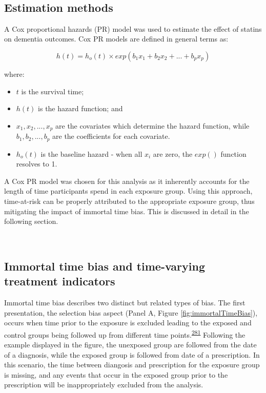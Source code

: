 \documentclass[a4paper, twoside]{templates/ociamthesis}
\providecommand{\tightlist}{%
  \setlength{\itemsep}{0pt}\setlength{\parskip}{0pt}}
\begin{document}
~

\hypertarget{estimation-methods}{%
\subsection{Estimation methods}\label{estimation-methods}}

A Cox proportional hazards (PR) model was used to estimate the effect of statins on dementia outcomes. Cox PR models are defined in general terms as:

\begin{equation}
  h(t) = h_o(t) \times exp(b_1x_1 + b_2x_2 + ... +b_px_p)
  \label{eq:cox-model}
\end{equation}

where:

\begin{itemize}
\tightlist
\item
  \(t\) is the survival time;
\item
  \(h(t)\) is the hazard function; and
\item
  \(x_1,x_2,...,x_p\) are the covariates which determine the hazard function, while \(b_1,b_2,...,b_p\) are the coefficients for each covariate.
\item
  \(h_o(t)\) is the baseline hazard - when all \(x_i\) are zero, the \(exp()\) function resolves to 1.
\end{itemize}

A Cox PR model was chosen for this analysis as it inherently accounts for the length of time participants spend in each exposure group. Using this approach, time-at-risk can be properly attributed to the appropriate exposure group, thus mitigating the impact of immortal time bias. This is discussed in detail in the following section.

~

\hypertarget{cprd-immortal-time-bias}{%
\subsection{Immortal time bias and time-varying treatment indicators}\label{cprd-immortal-time-bias}}

Immortal time bias describes two distinct but related types of bias. The first presentation, the selection bias aspect (Panel A, Figure \ref{fig:immortalTimeBias}), occurs when time prior to the exposure is excluded leading to the exposed and control groups being followed up from different time points.\textsuperscript{\protect\hyperlink{ref-levesque2010}{281}} Following the example displayed in the figure, the unexposed group are followed from the date of a diagnosis, while the exposed group is followed from date of a prescription. In this scenario, the time between diangosis and prescription for the exposure group is missing, and any events that occur in the exposed group prior to the prescription will be inappropriately excluded from the analysis.
\end{document}
